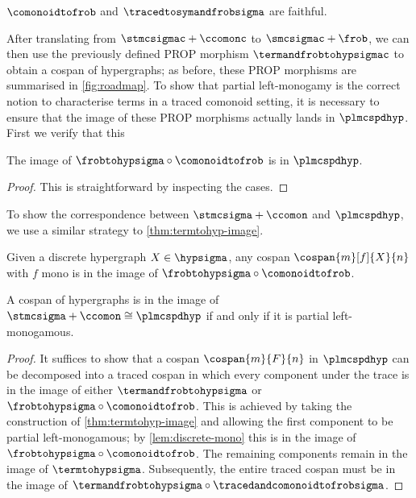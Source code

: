 \begin{corollary}
    \(\comonoidtofrob\) and \(\tracedtosymandfrobsigma\) are faithful.
\end{corollary}

After translating from \(\stmcsigmac + \ccomonc\) to \(\smcsigmac + \frob\),
we can then use the previously defined PROP morphism \(\termandfrobtohypsigmac\)
to obtain a cospan of hypergraphs; as before, these PROP morphisms are
summarised in \cref{fig:roadmap}.
To show that partial left-monogamy is the correct notion to characterise terms
in a traced comonoid setting, it is necessary to ensure that the image of these
PROP morphisms actually lands in \(\plmcspdhyp\).
First we verify that this

\begin{lemma}
    The image of \(\frobtohypsigma \circ \comonoidtofrob\) is in
    \(\plmcspdhyp\).
\end{lemma}
\begin{proof}
    This is straightforward by inspecting the cases.
\end{proof}

To show the correspondence between \(\stmcsigma + \ccomon\) and
\(\plmcspdhyp\), we use a similar strategy to \cref{thm:termtohyp-image}.

\begin{lemma}\label{lem:discrete-mono}
    Given a discrete hypergraph \(X \in \hypsigma\), any cospan
    \(\cospan{m}[f]{X}{n}\) with \(f\) mono is in the image of
    \(\frobtohypsigma \circ \comonoidtofrob\).
\end{lemma}

\begin{theorem}\label{thm:comonoid-fully-complete}
    A cospan of hypergraphs is in the image of
    \(\stmcsigma + \ccomon \cong \plmcspdhyp\) if and only if it is partial
    left-monogamous.
\end{theorem}
\begin{proof}
    It suffices to show that a cospan \(\cospan{m}{F}{n}\) in
    \(\plmcspdhyp\) can be decomposed into a traced cospan in which every
    component under the trace is in the image of either
    \(\termandfrobtohypsigma\) or \(\frobtohypsigma \circ \comonoidtofrob\).
    This is achieved by taking the construction of \cref{thm:termtohyp-image}
    and allowing the first component to be partial left-monogamous; by
    \cref{lem:discrete-mono} this is in the image of
    \(\frobtohypsigma \circ \comonoidtofrob\).
    The remaining components remain in the image of \(\termtohypsigma\).
    Subsequently, the entire traced cospan must be in the image of \(
    \termandfrobtohypsigma \circ \tracedandcomonoidtofrobsigma
    \).
\end{proof}

